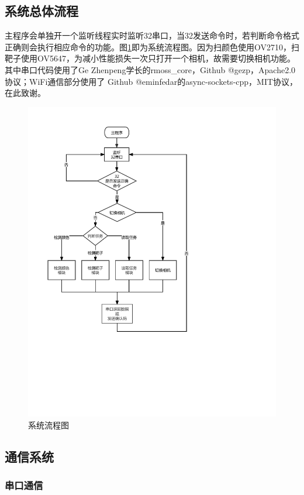 \documentclass[a4paper,11pt,UTF8]{ctexart}
\begin{document}
\newpage

\subsection{系统总体流程}
主程序会单独开一个监听线程实时监听32串口，当32发送命令时，若判断命令格式正确则会执行相应命令的功能。图\ref{fig_Process}即为系统流程图。因为扫颜色使用OV2710，扫靶子使用OV5647，为减小性能损失一次只打开一个相机，故需要切换相机功能。其中串口代码使用了Ge Zhenpeng学长的rmoss\_core，Github @gezp，Apache2.0协议\cite{UART}；WiFi通信部分使用了 Github @eminfedar的async-sockets-cpp，MIT协议\cite{Socket}，在此致谢。
\begin{figure}[htbp]
  \centering
  \includegraphics{process.pdf}
  \caption{系统流程图}\label{fig_Process}
\end{figure}

\subsection{通信系统}
\subsubsection{串口通信}
\end{document}
